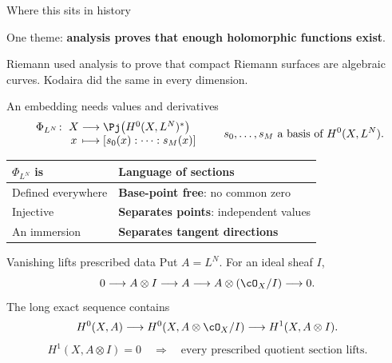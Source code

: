 \begin{frame}{Where this sits in history}
\begin{center}
\end{center}
\par\bigskip
One theme: \textbf{analysis proves that enough holomorphic functions exist}.
\par\medskip
Riemann used analysis to prove that compact Riemann surfaces are algebraic curves.
Kodaira did the same in every dimension.
\end{frame}

\begin{frame}{An embedding needs values and derivatives}
\[
\begin{array}{r@{\;}c@{\;}c@{\;}l}
\Phi_{L^N}\colon & X & \longrightarrow & \Pj\bigl(H^0(X,L^N)^*\bigr)\\
& x & \longmapsto & [s_0(x):\cdots:s_M(x)]
\end{array}
\qquad s_0,\ldots,s_M \text{ a basis of } H^0(X,L^N).
\]
\begin{center}
\renewcommand{\arraystretch}{1.8}
\begin{tabular}{ll}
\(\Phi_{L^N}\) is & Language of sections\\
\hline
Defined everywhere & \textbf{Base-point free}: no common zero\\
Injective & \textbf{Separates points}: independent values\\
An immersion & \textbf{Separates tangent directions}
\end{tabular}
\end{center}
\end{frame}

\begin{frame}{Vanishing lifts prescribed data}
Put \(A=L^N\). For an ideal sheaf \(I\),
\[
0\longrightarrow A\otimes I\longrightarrow A
\longrightarrow A\otimes(\cO_X/I)\longrightarrow0.
\]
The long exact sequence contains
\[
H^0(X,A)\longrightarrow H^0(X,A\otimes\cO_X/I)
\longrightarrow H^1(X,A\otimes I).
\]
\[
\boxed{H^1(X,A\otimes I)=0
\quad\Longrightarrow\quad\text{every prescribed quotient section lifts}.}
\]
\end{frame}

